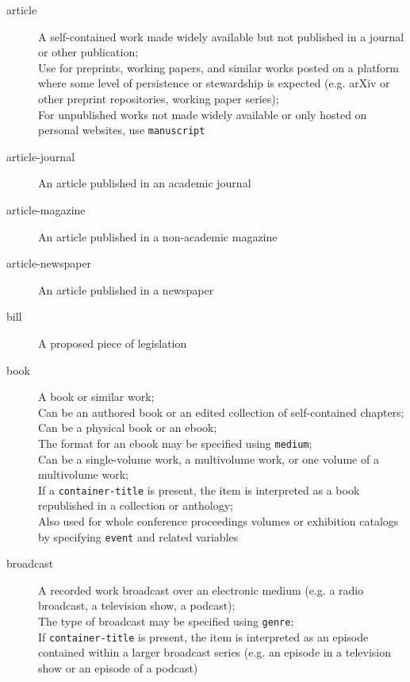 \begin{description}

  \item[article]
    A self-contained work made widely available but not published in a
    journal or other publication;\\
    Use for preprints, working papers, and similar works posted on a
    platform where some level of persistence or stewardship is expected
    (e.g. arXiv or other preprint repositories, working paper series);\\
    For unpublished works not made widely available or only hosted on
    personal websites, use \texttt{manuscript}

  \item[article-journal]
    An article published in an academic journal

  \item[article-magazine]
    An article published in a non-academic magazine

  \item[article-newspaper]
    An article published in a newspaper

  \item[bill]
    A proposed piece of legislation

  \item[book]
    A book or similar work;\\
    Can be an authored book or an edited collection of self-contained
    chapters;\\
    Can be a physical book or an ebook;\\
    The format for an ebook may be specified using \texttt{medium};\\
    Can be a single-volume work, a multivolume work, or one volume of a
    multivolume work;\\
    If a \texttt{container-title} is present, the item is interpreted as a
    book republished in a collection or anthology;\\
    Also used for whole conference proceedings volumes or exhibition
    catalogs by specifying \texttt{event} and related variables

  \item[broadcast]
    A recorded work broadcast over an electronic medium (e.g. a radio
    broadcast, a television show, a podcast);\\
    The type of broadcast may be specified using \texttt{genre};\\
    If \texttt{container-title} is present, the item is interpreted as an
    episode contained within a larger broadcast series (e.g. an episode in a
    television show or an episode of a podcast)


\end{description}
